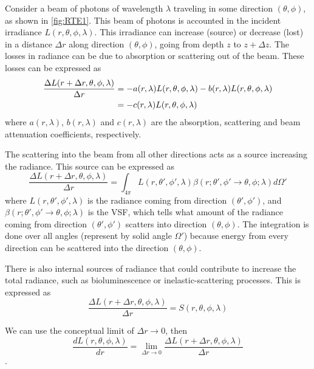 Consider a beam of photons of wavelength $\lambda$ traveling in some direction $(\theta,\phi)$, as shown in \autoref{fig:RTE1}. This beam of photons is accounted in the incident irradiance $L(r,\theta,\phi,\lambda)$. This irradiance can increase (source) or decrease (lost) in a distance $\Delta r$ along direction  $(\theta,\phi)$, going from depth $z$ to $z+\Delta z$. The losses in radiance can be due to absorption or scattering out of the beam. These losses can be expressed as
\begin{align}\label{eq:RTE1}
  \frac{\Delta L(r+\Delta r,\theta,\phi,\lambda)}{\Delta r}&= -a(r,\lambda)L(r,\theta,\phi,\lambda)-b(r,\lambda)L(r,\theta,\phi,\lambda)\notag\\ 
  &= -c(r,\lambda)L(r,\theta,\phi,\lambda) 
\end{align}
where $a(r,\lambda)$, $b(r,\lambda)$ and $c(r,\lambda)$ are the absorption, scattering and beam attenuation coefficients, respectively. 

The scattering into the beam from all other directions acts as a source increasing the radiance. This source can be expressed as
\begin{equation}\label{eq:RTE2}
\frac{\Delta L(r+\Delta r,\theta,\phi,\lambda)}{\Delta r} = \int_{4\pi} L(r,\theta',\phi',\lambda)\beta(r;\theta',\phi' \to \theta,\phi;\lambda)d\Omega'
\end{equation}
where $L(r,\theta',\phi',\lambda)$ is the radiance coming from direction $(\theta',\phi')$, and $\beta(r;\theta',\phi' \to \theta,\phi;\lambda)$ is the VSF, which tells what amount of the radiance coming from direction $(\theta',\phi')$ scatters into direction $(\theta,\phi)$. The integration is done over all angles (represent by solid angle $\Omega'$) because energy from every direction can be scattered into the direction $(\theta,\phi)$.

There is also internal sources of radiance that could contribute to increase the total radiance, such as bioluminescence or inelastic-scattering processes. This is expressed as
\begin{equation}\label{eq:RTE3}
    \frac{\Delta L(r+\Delta r,\theta,\phi,\lambda)}{\Delta r} = S(r,\theta,\phi,\lambda)
\end{equation}

We can use the conceptual limit of $\Delta r\rightarrow 0$, then
\begin{equation}\label{eq:lim}
  \frac{dL(r,\theta,\phi,\lambda)}{dr} = \lim_{\Delta r \to 0} \frac{\Delta L(r+\Delta r,\theta,\phi,\lambda)}{\Delta r}
\end{equation}. 

